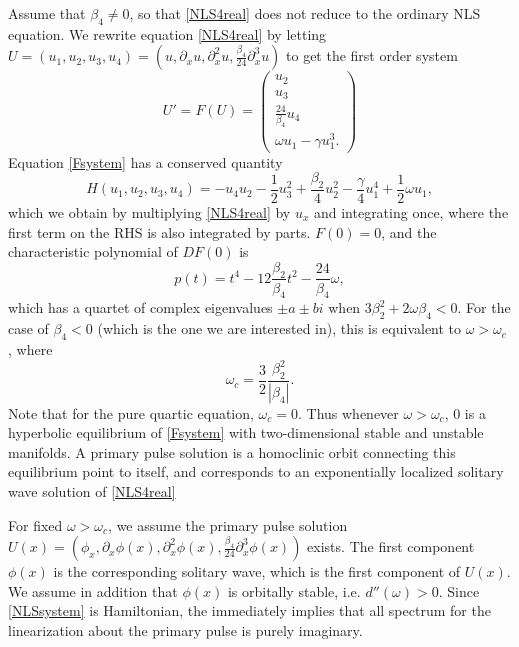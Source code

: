 \documentclass[12pt]{article}
\begin{document}
Assume that $\beta_4 \neq 0$, so that \cref{NLS4real} does not reduce to the ordinary NLS equation. We rewrite equation \cref{NLS4real} by letting $U = (u_1, u_2, u_3, u_4) = (u, \partial_x u, \partial_x^2 u, \frac{\beta_4}{24} \partial_x^3 u)$ to get the first order system
\begin{equation}\label{Fsystem}
U' = F(U) = \begin{pmatrix}
u_2 \\ u_3 \\ \frac{24}{\beta_4} u_4 \\ \omega u_1 - \gamma u_1^3.
\end{pmatrix}
\end{equation}
Equation \cref{Fsystem} has a conserved quantity
\begin{equation}\label{FsystemH}
H(u_1, u_2, u_3, u_4) = -u_4 u_2 - \frac{1}{2} u_3^2 + \frac{\beta_2}{4}u_2^2 - \frac{\gamma}{4} u_1^4 + \frac{1}{2}\omega u_1,
\end{equation}
which we obtain by multiplying \cref{NLS4real} by $u_x$ and integrating once, where the first term on the RHS is also integrated by parts. $F(0) = 0$, and the characteristic polynomial of $DF(0)$ is
\[
p(t) = t^4 - 12\frac{\beta_2}{\beta_4} t^2 - \frac{24}{\beta_4}\omega,
\]
which has a quartet of complex eigenvalues $\pm a \pm b i$ when $3 \beta_2^2 + 2 \omega \beta_4 < 0$. For the case of $\beta_4 < 0$ (which is the one we are interested in), this is equivalent to $\omega > \omega_c$ \cite[(11)]{Tam2020}, where
\begin{equation}\label{omegac}
\omega_c = \frac{3}{2} \frac{\beta_2^2}{|\beta_4|}.
\end{equation}
Note that for the pure quartic equation, $\omega_c = 0$. Thus whenever $\omega > \omega_c$, 0 is a hyperbolic equilibrium of \cref{Fsystem} with two-dimensional stable and unstable manifolds. A primary pulse solution is a homoclinic orbit connecting this equilibrium point to itself, and corresponds to an exponentially localized solitary wave solution of \cref{NLS4real}

For fixed $\omega > \omega_c$, we assume the primary pulse solution $U(x) = (\phi_x, \partial_x \phi(x), \partial_x^2 \phi(x), \frac{\beta_4}{24} \partial_x^3 \phi(x))$ exists. The first component $\phi(x)$ is the corresponding solitary wave, which is the first component of $U(x)$. We assume in addition that $\phi(x)$ is orbitally stable, i.e. $d''(\omega) > 0$. Since \cref{NLSsystem} is Hamiltonian, the immediately implies that all spectrum for the linearization about the primary pulse is purely imaginary.
\end{document}
